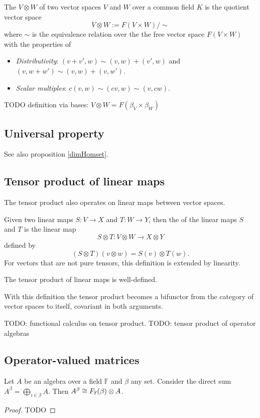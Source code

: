 The  $V\otimes W$ of two vector spaces $V$ and $W$ over a common field $K$ is the quotient vector space
\[ V\otimes W := F(V\times W)/\sim \]
where $\sim$ is the equivalence relation over the the free vector space $F(V\times W)$ with the properties of
\begin{itemize}
\item \textit{Distributivity}: $(v+v', w) \sim (v,w) + (v',w)$ and $(v, w+w') \sim (v,w) + (v,w')$.
\item \textit{Scalar multiples}: $c(v,w) \sim (cv,w) \sim (v,cw)$.
\end{itemize}



TODO definition via bases: $V\otimes W = F(\beta_V\times \beta_W)$

\subsection{Universal property}
See also proposition \ref{dimHomset}.


\subsection{Tensor product of linear maps}
The tensor product also operates on linear maps between vector spaces.
\begin{definition}
Given two linear maps $S: V\to X$ and $T:W\to Y$, then the  of the linear maps $S$ and $T$ is the linear map
\[ S\otimes T: V\otimes W \to X\otimes Y \]
defined by
\[ (S\otimes T)(v\otimes w) = S(v)\otimes T(w). \]
For vectors that are not pure tensors, this definition is extended by linearity.
\end{definition}
\begin{lemma}
The tensor product of linear maps is well-defined.
\end{lemma}

With this definition the tensor product becomes a bifunctor from the category of vector spaces to itself, covariant in both arguments.

TODO: functional calculus on tensor product.
TODO: tensor product of operator algebras


\subsection{Operator-valued matrices}
\begin{proposition}
Let $A$ be an algebra over a field $\mathbb{F}$ and $\beta$ any set. Consider the direct sum $A^\beta = \bigoplus_{i\in\beta}A$. Then $A^\beta \cong F_{\mathbb{F}}(\beta)\otimes A$.
\end{proposition}
\begin{proof}
TODO
\end{proof}


